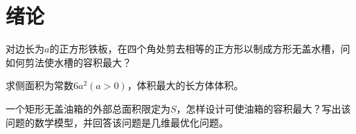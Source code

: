 \section{绪论}

\begin{example}
    对边长为$a$的正方形铁板，在四个角处剪去相等的正方形以制成方形无盖水槽，问如何剪法使水槽的容积最大？
\end{example}

\begin{example}
    求侧面积为常数$6a^2(a>0)$，体积最大的长方体体积。
\end{example}

\begin{problem}{1}
    一个矩形无盖油箱的外部总面积限定为$S$，怎样设计可使油箱的容积最大？写出该问题的数学模型，并回答该问题是几维最优化问题。
\end{problem}
